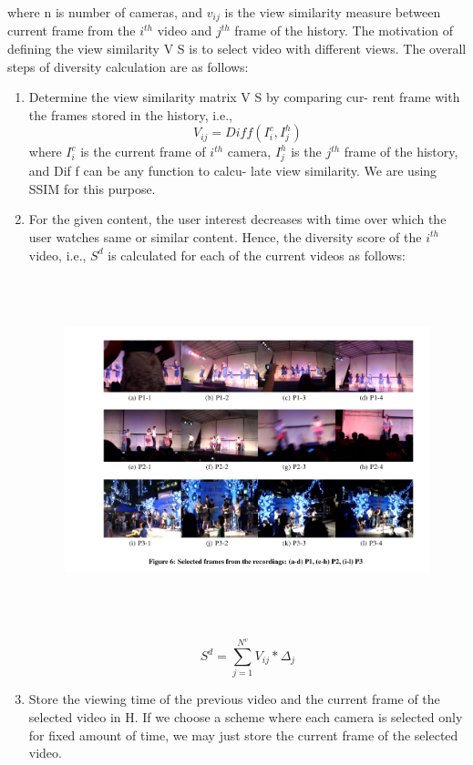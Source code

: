 \documentclass{sig-alternate}
\begin{document}
where n is number of cameras, and $v_{ij}$ is the view similarity
measure between current frame from the $i^{th}$ video and $j^{th}$ frame
of the history. The motivation of defining the view similarity V S is
to select video with different views. The overall steps of diversity
calculation are as follows:
\begin{enumerate}
\item Determine the view similarity matrix V S by comparing cur-
rent frame with the frames stored in the history, i.e.,
\[V_{ij} = Diff(I^c_i,I^h_j)\tag{15}\]
where $I^c_i$ is the current frame of $i^{th}$ camera, $I^h_j$ is the $j^{th}$
frame of the history, and Dif f can be any function to calcu-
late view similarity. We are using SSIM \cite{salas:seventeen} for this purpose.
\item For the given content, the user interest decreases with time
over which the user watches same or similar content. Hence,
the diversity score of the $i^{th}$ video, i.e., $S^{d}$ is calculated for
each of the current videos as follows:
\begin{figure}
  \includegraphics[width=\textwidth,height = 10cm]{five.pdf}
\end{figure}
\[S^d =\sum_{j=1}^{N^v}V_{ij}*\Delta_j\tag{16}\]
\item Store the viewing time of the previous video and the current
frame of the selected video in H. If we choose a scheme
where each camera is selected only for fixed amount of time,
we may just store the current frame of the selected video.


\end{enumerate}
\end{document}
